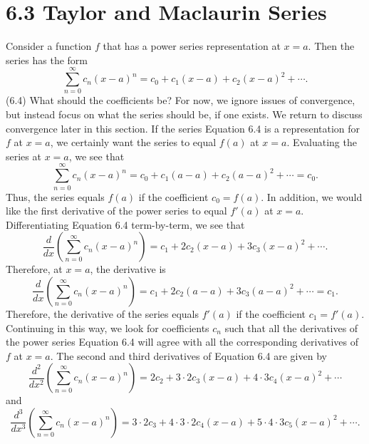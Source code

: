 \documentclass{report}
\begin{document}
    \pagebreak 
    \section*{6.3 Taylor and Maclaurin Series}
    \bigbreak \noindent 
    Consider a function $f$ that has a power series representation at $x=a$. Then the series has the form
    \begin{equation}
        \sum_{n=0}^{\infty} c_n(x-a)^n = c_0 + c_1(x-a) + c_2(x-a)^2 + \cdots.
    \end{equation}
    (6.4)
    What should the coefficients be? For now, we ignore issues of convergence, but instead focus on what the series should be, if one exists. We return to discuss convergence later in this section. If the series Equation 6.4 is a representation for $f$ at $x=a$, we certainly want the series to equal $f(a)$ at $x=a$. Evaluating the series at $x=a$, we see that
    \begin{equation}
        \sum_{n=0}^{\infty} c_n(x-a)^n = c_0 + c_1(a-a) + c_2(a-a)^2 + \cdots = c_0.
    \end{equation}
    Thus, the series equals $f(a)$ if the coefficient $c_0 = f(a)$. In addition, we would like the first derivative of the power series to equal $f'(a)$ at $x=a$. Differentiating Equation 6.4 term-by-term, we see that
    \begin{equation}
        \frac{d}{dx}\left(\sum_{n=0}^{\infty} c_n(x-a)^n\right) = c_1 + 2c_2(x-a) + 3c_3(x-a)^2 + \cdots.
    \end{equation}
    Therefore, at $x=a$, the derivative is
    \begin{equation}
        \frac{d}{dx}\left(\sum_{n=0}^{\infty} c_n(x-a)^n\right) = c_1 + 2c_2(a-a) + 3c_3(a-a)^2 + \cdots = c_1.
    \end{equation}
    Therefore, the derivative of the series equals $f'(a)$ if the coefficient $c_1 = f'(a)$. Continuing in this way, we look for coefficients $c_n$ such that all the derivatives of the power series Equation 6.4 will agree with all the corresponding derivatives of $f$ at $x=a$. The second and third derivatives of Equation 6.4 are given by
    \begin{equation}
        \frac{d^2}{dx^2}\left(\sum_{n=0}^{\infty} c_n(x-a)^n\right) = 2c_2 + 3 \cdot 2c_3(x-a) + 4 \cdot 3c_4(x-a)^2 + \cdots
    \end{equation}
    and
    \begin{equation}
        \frac{d^3}{dx^3}\left(\sum_{n=0}^{\infty} c_n(x-a)^n\right) = 3 \cdot 2c_3 + 4 \cdot 3 \cdot 2c_4(x-a) + 5 \cdot 4 \cdot 3c_5(x-a)^2 + \cdots.
    \end{equation}
\end{document}
